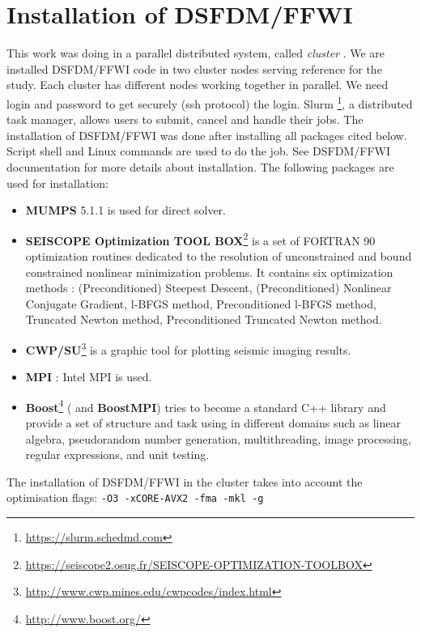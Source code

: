 \section{Installation of DSFDM/FFWI}
This work was doing in a parallel distributed system, called \textit{cluster} . We are installed DSFDM/FFWI code in two cluster nodes serving reference for the study. Each cluster has different nodes working together in parallel. We need login and password to get securely (ssh protocol) the login. Slurm \footnote{\url{https://slurm.schedmd.com}}, a distributed task manager, allows users to submit, cancel and handle their jobs. The installation of DSFDM/FFWI was done after installing all packages cited below. Script shell and Linux commands are used to do the job. See DSFDM/FFWI documentation for more details about installation. The following packages are used for installation:
\begin{itemize}
\item \textbf{MUMPS} 5.1.1 is used for direct solver.
\item \textbf{SEISCOPE Optimization TOOL BOX}\footnote{\url{https://seiscope2.osug.fr/SEISCOPE-OPTIMIZATION-TOOLBOX}} is a set of FORTRAN 90 optimization routines dedicated to the resolution of unconstrained and bound constrained nonlinear minimization problems. It contains six optimization methods : (Preconditioned) Steepest Descent, (Preconditioned) Nonlinear Conjugate Gradient, l-BFGS method, Preconditioned l-BFGS method, Truncated Newton method, Preconditioned Truncated Newton method.
\item \textbf{CWP/SU}\footnote{\url{http://www.cwp.mines.edu/cwpcodes/index.html}} is a graphic tool for plotting seismic imaging results.
\item \textbf{MPI} : Intel MPI is used. 
\item  \textbf{Boost}\footnote{\url{http://www.boost.org/}} ( and \textbf{BoostMPI}) tries to become a standard C++ library and provide a set of structure and task using in different domains such as linear algebra, pseudorandom number generation, multithreading, image processing, regular expressions, and unit testing.
\end{itemize} 

The installation of DSFDM/FFWI in the cluster takes into account the optimisation flags: \newline
 \verb|-O3 -xCORE-AVX2 -fma -mkl -g|   


